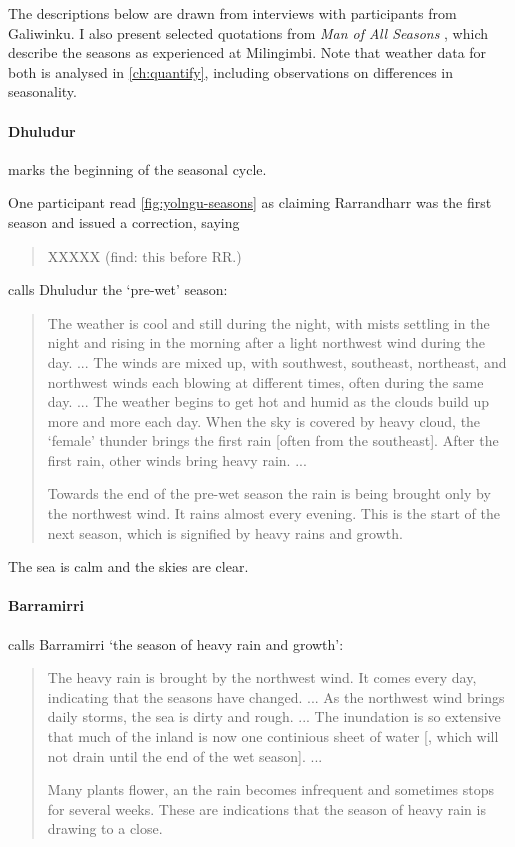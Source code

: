 The descriptions below are drawn from interviews with participants from Galiwinku.
I also present selected quotations from \textit{Man of All Seasons} \citep{davis1989},
which describe the seasons as experienced at Milingimbi.
Note that weather data for both is analysed in \autoref{ch:quantify},
including observations on differences in seasonality.


\paragraph{Dhuludur} marks the beginning of the seasonal cycle.

One participant read \autoref{fig:yolngu-seasons} as claiming Rarrandharr was the first season
and issued a correction, saying \blockquote{XXXXX (find: this before RR.)}.

\citet{davis1989} calls Dhuludur the `pre-wet' season:
\blockquote{
    The weather is cool and still during the night, with mists settling in the night and rising in the morning after a light northwest wind during the day. ...
    The winds are mixed up, with southwest, southeast, northeast, and northwest winds each blowing at different times, often during the same day. ...
    The weather begins to get hot and humid as the clouds build up more and more each day.
    When the sky is covered by heavy cloud, the `female' thunder brings the first rain [often from the southeast].
    After the first rain, other winds bring heavy rain. ...
    
    Towards the end of the pre-wet season the rain is being brought only by the northwest wind.
    It rains almost every evening.
    This is the start of the next season, which is signified by heavy rains and growth.
}

The sea is calm and the skies are clear.


\paragraph{Barramirri}

\citet{davis1989} calls Barramirri `the season of heavy rain and growth':
\blockquote{
    The heavy rain is brought by the northwest wind. It comes every day, indicating that the seasons have changed. ...
    As the northwest wind brings daily storms, the sea is dirty and rough. ...
    The inundation is so extensive that much of the inland is now one continious sheet of water [, which will not drain until the end of the wet season]. ...
    
    Many plants flower, an the rain becomes infrequent and sometimes stops for several weeks.
    These are indications that the season of heavy rain is drawing to a close.
}


